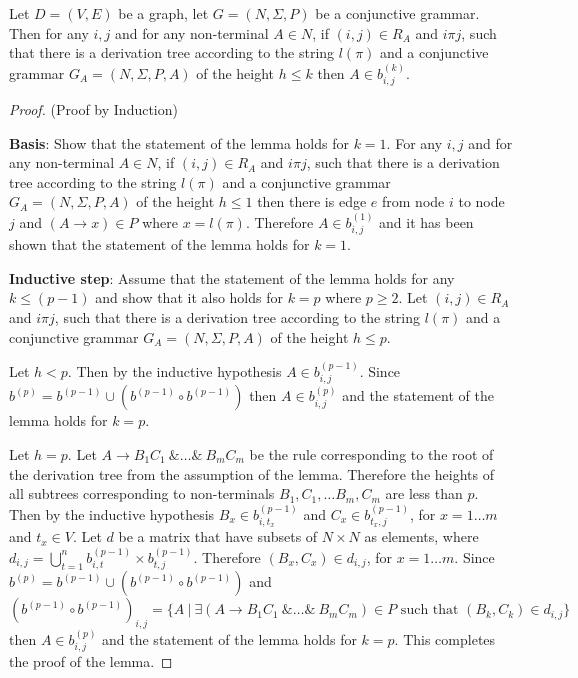 \begin{lemma}\label{lemma:conj}
    Let $D = (V,E)$ be a graph, let $G =(N,\Sigma,P)$ be a conjunctive grammar. Then for any $i, j$ and for any non-terminal $A \in N$, if $(i,j) \in R_A$ and $i \pi j$, such that there is a derivation tree according to the string $l(\pi)$ and a conjunctive grammar $G_A = (N,\Sigma,P,A)$ of the height $h \leq k$ then $A \in b^{(k)}_{i,j}$.
\end{lemma}
\begin{proof}(Proof by Induction)
    
    \textbf{Basis}: Show that the statement of the lemma holds for $k = 1$. For any $i, j$ and for any non-terminal $A \in N$, if $(i,j) \in R_A$ and $i \pi j$, such that there is a derivation tree according to the string $l(\pi)$ and a conjunctive grammar $G_A = (N,\Sigma,P,A)$ of the height $h \leq 1$ then there is edge $e$ from node $i$ to node $j$ and $(A \rightarrow x) \in P$ where $x = l(\pi)$. Therefore $A \in b^{(1)}_{i,j}$ and it has been shown that the statement of the lemma holds for $k = 1$.
    
    \textbf{Inductive step}: Assume that the statement of the lemma holds for any $k \leq (p - 1)$ and show that it also holds for $k = p$ where $p \geq 2$. Let $(i,j) \in R_A$ and $i \pi j$, such that there is a derivation tree according to the string $l(\pi)$ and a conjunctive grammar $G_A = (N,\Sigma,P,A)$ of the height $h \leq p$.
    
    Let $h < p$. Then by the inductive hypothesis $A \in b^{(p-1)}_{i,j}$. Since $b^{(p)} = b^{(p-1)} \cup (b^{(p-1)} \circ b^{(p-1)})$ then $A \in b^{(p)}_{i,j}$ and the statement of the lemma holds for $k = p$.
    
    Let $h = p$. Let $A \rightarrow B_1 C_1~\& \ldots \&~B_m C_m$ be the rule corresponding to the root of the derivation tree from the assumption of the lemma. Therefore the heights of all subtrees corresponding to non-terminals $B_1, C_1, \ldots B_m, C_m$ are less than $p$. Then by the inductive hypothesis $B_x \in b^{(p-1)}_{i,t_x}$ and $C_x \in b^{(p-1)}_{t_x,j}$, for $x = 1\ldots m$ and $t_x \in V$. Let $d$ be a matrix that have subsets of $N \times N$ as elements, where $d_{i,j} = \bigcup^{n}_{t=1}{b^{(p-1)}_{i,t} \times b^{(p-1)}_{t,j}}$. Therefore $(B_x, C_x) \in d_{i,j}$, for $x = 1\ldots m$. Since $b^{(p)} = b^{(p-1)} \cup (b^{(p-1)} \circ b^{(p-1)})$ and $(b^{(p-1)} \circ b^{(p-1)})_{i,j} = \{A~|~\exists (A \rightarrow B_1 C_1~\& \ldots \&~B_m C_m) \in P \text{ such that } (B_k, C_k) \in d_{i,j} \}$ then $A \in b^{(p)}_{i,j}$ and the statement of the lemma holds for $k = p$. This completes the proof of the lemma.
\end{proof}

